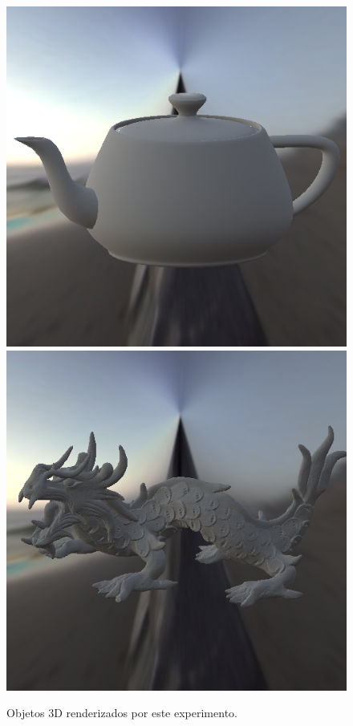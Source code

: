 \begin{figure}[H]
    \caption{\small{Objetos 3D renderizados por este experimento.}}
    \label{fig-oren-nayar-eqlang}
  \includegraphics[width=\linewidth]{./Imagens/brdfs/oren-nayar-teapot.png}
\endminipage\hfill
{}
  \includegraphics[width=\linewidth]{./Imagens/brdfs/oren-nayar-dragon.png}

\end{figure}
